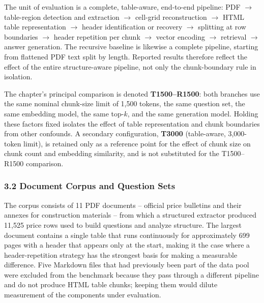 \documentclass[11pt,a4paper]{article}
\begin{document}
The unit of evaluation is a complete, table-aware, end-to-end pipeline:
PDF $\rightarrow$ table-region detection and extraction $\rightarrow$
cell-grid reconstruction $\rightarrow$ HTML table representation
$\rightarrow$ header identification or recovery $\rightarrow$ splitting at
row boundaries $\rightarrow$ header repetition per chunk $\rightarrow$
vector encoding $\rightarrow$ retrieval $\rightarrow$ answer generation. The
recursive baseline is likewise a complete pipeline, starting from flattened
PDF text split by length. Reported results therefore reflect the effect of
the entire structure-aware pipeline, not only the chunk-boundary rule in
isolation.

The chapter's principal comparison is denoted \textbf{T1500--R1500}: both
branches use the same nominal chunk-size limit of 1,500 tokens, the same
question set, the same embedding model, the same top-$k$, and the same
generation model. Holding these factors fixed isolates the effect of table
representation and chunk boundaries from other confounds. A secondary
configuration, \textbf{T3000} (table-aware, 3,000-token limit), is retained
only as a reference point for the effect of chunk size on chunk count and
embedding similarity, and is not substituted for the T1500--R1500 comparison.

\subsubsection{3.2 Document Corpus and Question Sets}

The corpus consists of 11 PDF documents -- official price bulletins and
their annexes for construction materials -- from which a structured
extractor produced 11,525 price rows used to build questions and analyze
structure. The largest document contains a single table that runs
continuously for approximately 699 pages with a header that appears only at
the start, making it the case where a header-repetition strategy has the
strongest basis for making a measurable difference. Five Markdown files that
had previously been part of the data pool were excluded from the benchmark
because they pass through a different pipeline and do not produce HTML table
chunks; keeping them would dilute measurement of the components under
evaluation.
\end{document}
